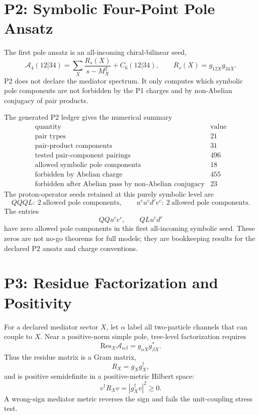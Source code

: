 \documentclass[11pt]{article}
\newcommand{\Res}{\mathrm{Res}}
\newcommand{\uc}{u^c}
\newcommand{\dc}{d^c}
\newcommand{\ec}{e^c}
\begin{document}
\section{P2: Symbolic Four-Point Pole Ansatz}

The first pole ansatz is an all-incoming chiral-bilinear seed,
\begin{equation}
  \mathcal A_4(12|34)
  =
  \sum_X\frac{R_s(X)}{s-M_X^2}+C_6(12|34),
  \qquad
  R_s(X)=g_{12X}g_{34\bar X}.
\end{equation}
P2 does not declare the mediator spectrum.  It only computes which
symbolic pole components are not forbidden by the P1 charges and by
non-Abelian conjugacy of pair products.

The generated P2 ledger gives the numerical summary
\begin{equation}
\begin{array}{c|c}
\text{quantity} & \text{value} \\
\hline
\text{pair types} & 21\\
\text{pair-product components} & 31\\
\text{tested pair-component pairings} & 496\\
\text{allowed symbolic pole components} & 18\\
\text{forbidden by Abelian charge} & 455\\
\text{forbidden after Abelian pass by non-Abelian conjugacy} & 23
\end{array}
\end{equation}
The proton-operator seeds retained at this purely symbolic level are
\begin{equation}
  QQQL:\ 2 \ \text{allowed pole components},\qquad
  \uc\uc\dc\ec:\ 2 \ \text{allowed pole components}.
\end{equation}
The entries
\begin{equation}
  QQ\uc\ec,\qquad QL\uc\dc
\end{equation}
have zero allowed pole components in this first all-incoming symbolic
seed.  These zeros are not no-go theorems for full models; they are
bookkeeping results for the declared P2 ansatz and charge conventions.

\section{P3: Residue Factorization and Positivity}

For a declared mediator sector $X$, let $\alpha$ label all two-particle
channels that can couple to $X$.  Near a positive-norm simple pole,
tree-level factorization requires
\begin{equation}
  \Res_X \mathcal A_{\alpha\beta}
  =
  g_{\alpha X}g_{\beta X}^\ast .
\end{equation}
Thus the residue matrix is a Gram matrix,
\begin{equation}
  R_X = g_X g_X^\dagger,
\end{equation}
and is positive semidefinite in a positive-metric Hilbert space:
\begin{equation}
  v^\dagger R_X v = |g_X^\dagger v|^2\ge 0.
\end{equation}
A wrong-sign mediator metric reverses the sign and fails the unit-coupling
stress test.
\end{document}
